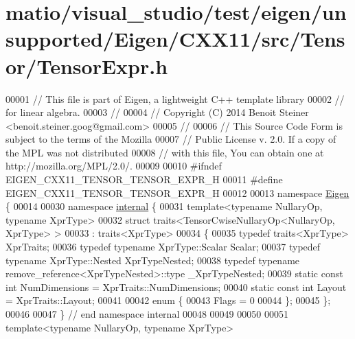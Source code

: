 \hypertarget{matio_2visual__studio_2test_2eigen_2unsupported_2_eigen_2_c_x_x11_2src_2_tensor_2_tensor_expr_8h_source}{}\section{matio/visual\+\_\+studio/test/eigen/unsupported/\+Eigen/\+C\+X\+X11/src/\+Tensor/\+Tensor\+Expr.h}
\label{matio_2visual__studio_2test_2eigen_2unsupported_2_eigen_2_c_x_x11_2src_2_tensor_2_tensor_expr_8h_source}

\begin{DoxyCode}
00001 \textcolor{comment}{// This file is part of Eigen, a lightweight C++ template library}
00002 \textcolor{comment}{// for linear algebra.}
00003 \textcolor{comment}{//}
00004 \textcolor{comment}{// Copyright (C) 2014 Benoit Steiner <benoit.steiner.goog@gmail.com>}
00005 \textcolor{comment}{//}
00006 \textcolor{comment}{// This Source Code Form is subject to the terms of the Mozilla}
00007 \textcolor{comment}{// Public License v. 2.0. If a copy of the MPL was not distributed}
00008 \textcolor{comment}{// with this file, You can obtain one at http://mozilla.org/MPL/2.0/.}
00009 
00010 \textcolor{preprocessor}{#ifndef EIGEN\_CXX11\_TENSOR\_TENSOR\_EXPR\_H}
00011 \textcolor{preprocessor}{#define EIGEN\_CXX11\_TENSOR\_TENSOR\_EXPR\_H}
00012 
00013 \textcolor{keyword}{namespace }\hyperlink{namespace_eigen}{Eigen} \{
00014 
00030 \textcolor{keyword}{namespace }\hyperlink{namespaceinternal}{internal} \{
00031 \textcolor{keyword}{template}<\textcolor{keyword}{typename} NullaryOp, \textcolor{keyword}{typename} XprType>
00032 \textcolor{keyword}{struct }traits<TensorCwiseNullaryOp<NullaryOp, XprType> >
00033     : traits<XprType>
00034 \{
00035   \textcolor{keyword}{typedef} traits<XprType> XprTraits;
00036   \textcolor{keyword}{typedef} \textcolor{keyword}{typename} XprType::Scalar Scalar;
00037   \textcolor{keyword}{typedef} \textcolor{keyword}{typename} XprType::Nested XprTypeNested;
00038   \textcolor{keyword}{typedef} \textcolor{keyword}{typename} remove\_reference<XprTypeNested>::type \_XprTypeNested;
00039   \textcolor{keyword}{static} \textcolor{keyword}{const} \textcolor{keywordtype}{int} NumDimensions = XprTraits::NumDimensions;
00040   \textcolor{keyword}{static} \textcolor{keyword}{const} \textcolor{keywordtype}{int} Layout = XprTraits::Layout;
00041 
00042   \textcolor{keyword}{enum} \{
00043     Flags = 0
00044   \};
00045 \};
00046 
00047 \}  \textcolor{comment}{// end namespace internal}
00048 
00049 
00050 
00051 \textcolor{keyword}{template}<\textcolor{keyword}{typename} NullaryOp, \textcolor{keyword}{typename} XprType>

\end{DoxyCode}
